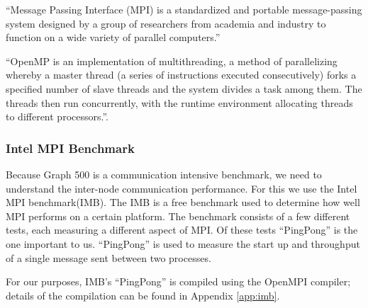 ``Message Passing Interface (MPI) is a standardized and portable message-passing system designed by a group of researchers from academia and industry to function on a wide variety of parallel computers.''\cite{mpi}

``OpenMP is an implementation of multithreading, a method of parallelizing whereby a master thread (a series of instructions executed consecutively) forks a specified number of slave threads and the system divides a task among them. The threads then run concurrently, with the runtime environment allocating threads to different processors.''\cite{openmp}.


\subsubsection{Intel MPI Benchmark}
\label{tools-imb}
Because Graph 500 is a communication intensive benchmark, we need to understand the inter-node communication performance. For this we use the Intel MPI benchmark(IMB).  
The IMB is a free benchmark used to determine how well MPI performs on a certain platform. The benchmark consists of a few different tests, each measuring a different aspect of MPI. Of these tests ``PingPong'' is the one important to us. ``PingPong''\cite{img-userguide} is used to measure the start up and throughput of a single message sent between two processes.

For our purposes, IMB's ``PingPong'' is compiled using the OpenMPI compiler; details of the compilation can be found in Appendix \ref{app:imb}.

